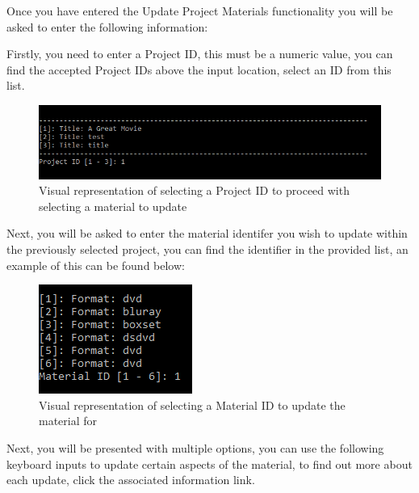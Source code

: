\documentclass[
  english,
  a4paper,
,tablecaptionabove
]{scrartcl}
\begin{document}
Once you have entered the Update Project Materials functionality you
will be asked to enter the following information:

Firstly, you need to enter a Project ID, this must be a numeric value,
you can find the accepted Project IDs above the input location, select
an ID from this list.

\begin{figure}
\centering
\includegraphics{images/user-guide/maintenance-mode/update-project-select-id.png}
\caption{Visual representation of selecting a Project ID to proceed with
selecting a material to update}
\end{figure}

Next, you will be asked to enter the material identifer you wish to
update within the previously selected project, you can find the
identifier in the provided list, an example of this can be found below:

\begin{figure}
\centering
\includegraphics{images/user-guide/maintenance-mode/update-project-material-select-material-id.png}
\caption{Visual representation of selecting a Material ID to update the
material for}
\end{figure}

Next, you will be presented with multiple options, you can use the
following keyboard inputs to update certain aspects of the material, to
find out more about each update, click the associated information link.
\end{document}
